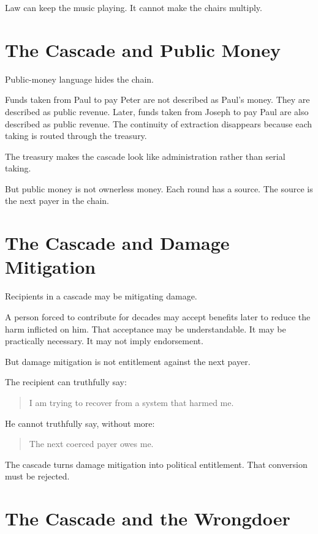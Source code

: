 \documentclass[12pt]{article}
\begin{document}
Law can keep the music playing. It cannot make the chairs multiply.

\section{The Cascade and Public Money}

Public-money language hides the chain.

Funds taken from Paul to pay Peter are not described as Paul's money. They are described as public revenue. Later, funds taken from Joseph to pay Paul are also described as public revenue. The continuity of extraction disappears because each taking is routed through the treasury.

The treasury makes the cascade look like administration rather than serial taking.

But public money is not ownerless money. Each round has a source. The source is the next payer in the chain.

\section{The Cascade and Damage Mitigation}

Recipients in a cascade may be mitigating damage.

A person forced to contribute for decades may accept benefits later to reduce the harm inflicted on him. That acceptance may be understandable. It may be practically necessary. It may not imply endorsement.

But damage mitigation is not entitlement against the next payer.

The recipient can truthfully say:

\begin{quote}
I am trying to recover from a system that harmed me.
\end{quote}

He cannot truthfully say, without more:

\begin{quote}
The next coerced payer owes me.
\end{quote}

The cascade turns damage mitigation into political entitlement. That conversion must be rejected.

\section{The Cascade and the Wrongdoer}
\end{document}
